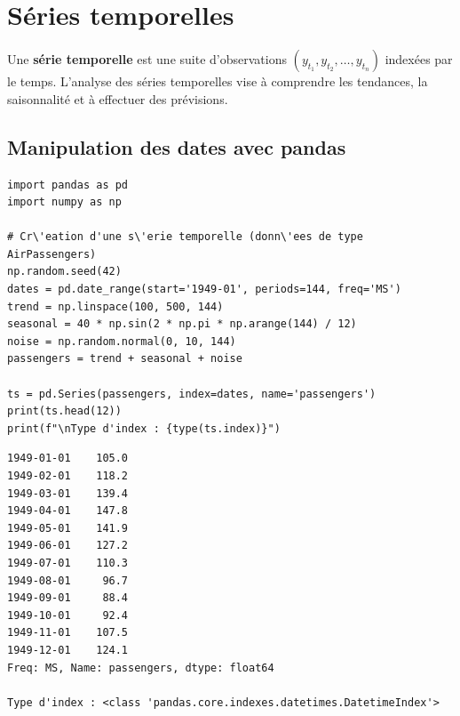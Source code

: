 \section{S\'eries temporelles}
\label{sec:series_temporelles}


\begin{definition}
Une \textbf{s\'erie temporelle} est une suite d'observations $(y_{t_1}, y_{t_2}, \ldots, y_{t_n})$ index\'ees par le temps. L'analyse des s\'eries temporelles vise \`a comprendre les tendances, la saisonnalit\'e et \`a effectuer des pr\'evisions.
\end{definition}

\subsection{Manipulation des dates avec pandas}


\begin{codeblock}[title=\textbf{Python}]
\begin{verbatim}
import pandas as pd
import numpy as np

# Cr\'eation d'une s\'erie temporelle (donn\'ees de type AirPassengers)
np.random.seed(42)
dates = pd.date_range(start='1949-01', periods=144, freq='MS')
trend = np.linspace(100, 500, 144)
seasonal = 40 * np.sin(2 * np.pi * np.arange(144) / 12)
noise = np.random.normal(0, 10, 144)
passengers = trend + seasonal + noise

ts = pd.Series(passengers, index=dates, name='passengers')
print(ts.head(12))
print(f"\nType d'index : {type(ts.index)}")
\end{verbatim}
\end{codeblock}

\begin{codeoutput}
\begin{verbatim}
1949-01-01    105.0
1949-02-01    118.2
1949-03-01    139.4
1949-04-01    147.8
1949-05-01    141.9
1949-06-01    127.2
1949-07-01    110.3
1949-08-01     96.7
1949-09-01     88.4
1949-10-01     92.4
1949-11-01    107.5
1949-12-01    124.1
Freq: MS, Name: passengers, dtype: float64

Type d'index : <class 'pandas.core.indexes.datetimes.DatetimeIndex'>
\end{verbatim}
\end{codeoutput}

